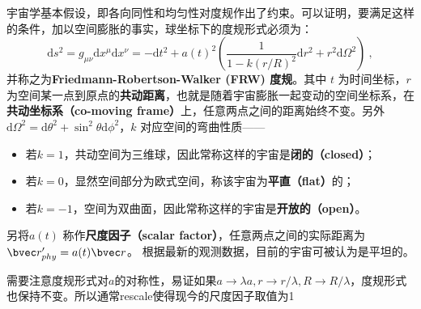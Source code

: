 
宇宙学基本假设，即各向同性和均匀性对度规作出了约束。可以证明，要满足这样的条件，加以空间膨胀的事实，球坐标下的度规形式必须为：
\begin{equation}
\mathrm{d}s^2=g_{\mu\nu}\mathrm{d}x^{\mu}\mathrm{d}x^{\nu}=-\mathrm{d}t^2+a(t)^2 \left( \frac{1}{1-k(r/R)^2}\mathrm{d}r^2+r^2 \mathrm{d} \Omega^2\right)~,
\end{equation}
并称之为\textbf{Friedmann-Robertson-Walker (FRW) 度规}。其中 $t$ 为时间坐标，$r$ 为空间某一点到原点的\textbf{共动距离}，也就是随着宇宙膨胀一起变动的空间坐标系，在\textbf{共动坐标系（co-moving frame）}上，任意两点之间的距离始终不变。另外$\mathrm{d} \Omega^2 =\mathrm{d} \theta^2 + \sin^2\theta\mathrm{d} \phi^2 $，$k$ 对应空间的弯曲性质——
\begin{itemize}
\item 若$k=1$，共动空间为三维球，因此常称这样的宇宙是\textbf{闭的（closed）}；
\item 若$k=0$，显然空间部分为欧式空间，称该宇宙为\textbf{平直（flat）}的；
\item 若$k=-1$，空间为双曲面，因此常称这样的宇宙是\textbf{开放的（open）}。
\end{itemize}
 另将$a(t)$ 称作\textbf{尺度因子（scalar factor）}，任意两点之间的实际距离为$\bvec r'_{phy}=a(t)\bvec r$。
根据最新的观测数据，目前的宇宙可被认为是平坦的。

需要注意度规形式对$a$的对称性，易证如果$a\rightarrow \lambda a,r\rightarrow r/\lambda, R\rightarrow R/\lambda$，度规形式也保持不变。所以通常rescale使得现今的尺度因子取值为1

